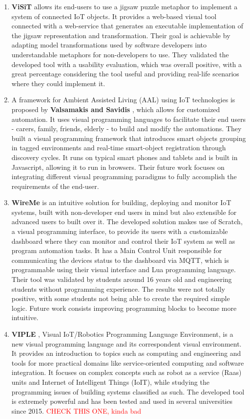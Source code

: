 \begin{enumerate}
    \item \textbf{ViSiT} \cite{visit} allows its end-users to use a jigsaw puzzle metaphor to implement a system of connected IoT objects. It provides a web-based visual tool connected with a web-service that generates an executable implementation of the jigsaw representation and transformation. Their goal is achievable by adapting model transformations used by software developers into understandable metaphors for non-developers to use. They validated the developed tool with a usability evaluation, which was overall positive, with a great percentage considering the tool useful and providing real-life scenarios where they could implement it.
    \item A framework for Ambient Assisted Living (AAL) using IoT technologies is proposed by \textbf{Valsamakis and Savidis} \cite{Valsamakis2017}, which allows for customized automation. It uses visual programming languages to facilitate their end users - carers, family, friends, elderly - to build and modify the automations. They built a visual programming framework that introduces smart objects grouping in tagged environments and real-time smart-object registration through discovery cycles. It runs on typical smart phones and tablets and is built in Javascript, allowing it to run in browsers. Their future work focuses on integrating different visual programming paradigms to fully accomplish the requirements of the end-user.
    \item \textbf{WireMe} \cite{wireme} is an intuitive solution for building, deploying and monitor IoT systems, built with non-developer end users in mind but also extensible for advanced users to built over it. The developed solution makes use of Scratch, a visual programming interface, to provide its users with a customizable dashboard where they can monitor and control their IoT system as well as program automation tasks. It has a Main Control Unit responsible for communicating the devices status to the dashboard via MQTT, which is programmable using their visual interface and Lua programming language. Their tool was validated by students around 16 years old and engineering students without programming experience. The results were not totally positive, with some students not being able to create the required simple logic. Future work consists improving programming blocks to become more intuitive.
    \item \textbf{VIPLE} \cite{viple}, Visual IoT/Robotics Programming Language Environment, is a new visual programming language and its correspondent visual environment. It provides an introduction to topics such as computing and engineering and tools for more practical domains like service-oriented computing and software integration. It focuses on complex concepts such as robot as a service (Raas) units and Internet of Intelligent Things (IoIT), while studying the programming issues of building systems classified as such. The developed tool is extremely powerful and has been tested and used in several universities since 2015. \textcolor{red}{CHECK THIS ONE, kinda bad}

\end{enumerate}
